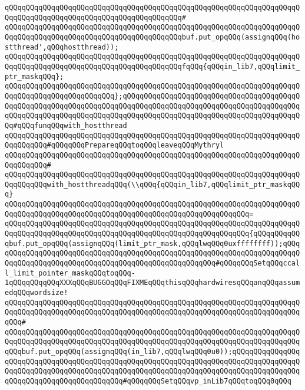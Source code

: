 \verb|qQQqqQQqqQQqqQQqqQQqqQQqqQQqqQQqqQQqqQQqqQQqqQQqqQQqqQQqqQQqqQQqqQQqqQQqqQQqqQQqqQQqqQQqqQQqqQQqqQQqqQQqqQQqqQQq#|\newline
\verb|qQQqqQQqqQQqqQQqqQQqqQQqqQQqqQQqqQQqqQQqqQQqqQQqqQQqqQQqqQQqqQQqqQQqqQQqqQQqqQQqqQQqqQQqqQQqqQQqqQQqqQQqqQQqqQQqbuf.put_opqQQq(assignqQQq(hostthread',qQQqhostthread));|\newline
\newline
\verb|qQQqqQQqqQQqqQQqqQQqqQQqqQQqqQQqqQQqqQQqqQQqqQQqqQQqqQQqqQQqqQQqqQQqqQQqqQQqqQQqqQQqqQQqqQQqqQQqqQQqqQQqqQQqqQQqfqQQq{qQQqin_lib7,qQQqlimit_ptr_maskqQQq};|\newline
\newline
\verb|qQQqqQQqqQQqqQQqqQQqqQQqqQQqqQQqqQQqqQQqqQQqqQQqqQQqqQQqqQQqqQQqqQQqqQQqqQQqqQQqqQQqqQQqqQQqqQQq};qQQqqQQqqQQqqQQqqQQqqQQqqQQqqQQqqQQqqQQqqQQqqQQqqQQqqQQqqQQqqQQqqQQqqQQqqQQqqQQqqQQqqQQqqQQqqQQqqQQqqQQqqQQqqQQqqQQqqQQqqQQqqQQqqQQqqQQqqQQqqQQqqQQqqQQqqQQqqQQqqQQqqQQqqQQqqQQqqQQqqQQq#qQQqfunqQQqwith_hostthread|\newline
\newline
\verb|qQQqqQQqqQQqqQQqqQQqqQQqqQQqqQQqqQQqqQQqqQQqqQQqqQQqqQQqqQQqqQQqqQQqqQQqqQQqqQQq#qQQqqQQqPrepareqQQqtoqQQqleaveqQQqMythryl|\newline
\verb|qQQqqQQqqQQqqQQqqQQqqQQqqQQqqQQqqQQqqQQqqQQqqQQqqQQqqQQqqQQqqQQqqQQqqQQqqQQqqQQq#|\newline
\verb|qQQqqQQqqQQqqQQqqQQqqQQqqQQqqQQqqQQqqQQqqQQqqQQqqQQqqQQqqQQqqQQqqQQqqQQqqQQqqQQqwith_hostthreadqQQq(\\qQQq{qQQqin_lib7,qQQqlimit_ptr_maskqQQq}|\newline
\verb|qQQqqQQqqQQqqQQqqQQqqQQqqQQqqQQqqQQqqQQqqQQqqQQqqQQqqQQqqQQqqQQqqQQqqQQqqQQqqQQqqQQqqQQqqQQqqQQqqQQqqQQqqQQqqQQqqQQqqQQqqQQqqQQq=|\newline
\verb|qQQqqQQqqQQqqQQqqQQqqQQqqQQqqQQqqQQqqQQqqQQqqQQqqQQqqQQqqQQqqQQqqQQqqQQqqQQqqQQqqQQqqQQqqQQqqQQqqQQqqQQqqQQqqQQqqQQqqQQqqQQqqQQq{qQQqqQQqqQQqbuf.put_opqQQq(assignqQQq(limit_ptr_mask,qQQqlwqQQq0uxffffffff));qQQqqQQqqQQqqQQqqQQqqQQqqQQqqQQqqQQqqQQqqQQqqQQqqQQqqQQqqQQqqQQqqQQqqQQqqQQqqQQqqQQqqQQqqQQqqQQqqQQqqQQqqQQqqQQqqQQqqQQqqQQq#qQQqqQQqSetqQQqccall_limit_pointer_maskqQQqtoqQQq-1qQQqqQQqqQQqXXXqQQqBUGGOqQQqFIXMEqQQqthisqQQqhardwiresqQQqanqQQqassumedqQQqwordsize!|\newline
\verb|qQQqqQQqqQQqqQQqqQQqqQQqqQQqqQQqqQQqqQQqqQQqqQQqqQQqqQQqqQQqqQQqqQQqqQQqqQQqqQQqqQQqqQQqqQQqqQQqqQQqqQQqqQQqqQQqqQQqqQQqqQQqqQQqqQQqqQQqqQQqqQQq#|\newline
\verb|qQQqqQQqqQQqqQQqqQQqqQQqqQQqqQQqqQQqqQQqqQQqqQQqqQQqqQQqqQQqqQQqqQQqqQQqqQQqqQQqqQQqqQQqqQQqqQQqqQQqqQQqqQQqqQQqqQQqqQQqqQQqqQQqqQQqqQQqqQQqqQQqbuf.put_opqQQq(assignqQQq(in_lib7,qQQqlwqQQq0u0));qQQqqQQqqQQqqQQqqQQqqQQqqQQqqQQqqQQqqQQqqQQqqQQqqQQqqQQqqQQqqQQqqQQqqQQqqQQqqQQqqQQqqQQqqQQqqQQqqQQqqQQqqQQqqQQqqQQqqQQqqQQqqQQqqQQqqQQqqQQqqQQqqQQqqQQqqQQqqQQqqQQqqQQqqQQqqQQqqQQqqQQq#qQQqqQQqSetqQQqvp_inLib7qQQqtoqQQq0qQQq|\newline
